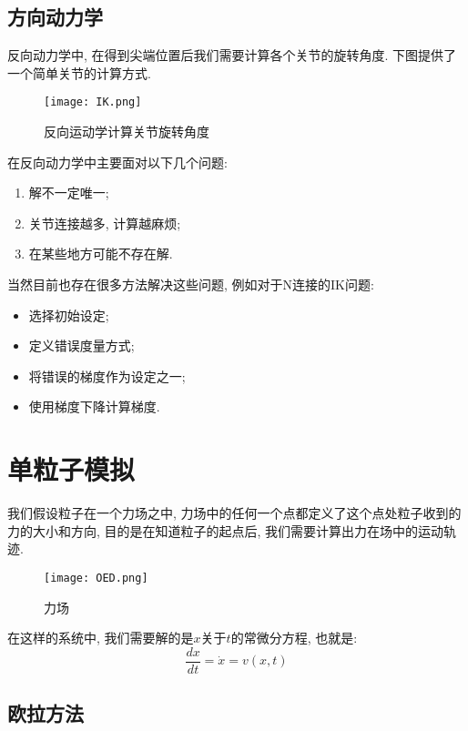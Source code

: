 \documentclass[openany]{progbookcn}
\begin{document}
\subsection{方向动力学}

反向动力学中, 在得到尖端位置后我们需要计算各个关节的旋转角度. 下图提供了一个简单关节的计算方式. 

\begin{figure}[H]
	\centering
	\texttt{[image: IK.png]}
	\caption{反向运动学计算关节旋转角度}
	\label{fig:ik}
\end{figure}

在反向动力学中主要面对以下几个问题: 
\begin{enumerate}
	\item 解不一定唯一; 
	\item 关节连接越多, 计算越麻烦; 
	\item 在某些地方可能不存在解. 
\end{enumerate}

当然目前也存在很多方法解决这些问题, 例如对于N连接的IK问题: 

\begin{itemize}
	\item 选择初始设定; 
	\item 定义错误度量方式; 
	\item 将错误的梯度作为设定之一; 
	\item 使用梯度下降计算梯度. 
\end{itemize}

\section{单粒子模拟}

我们假设粒子在一个力场之中, 力场中的任何一个点都定义了这个点处粒子收到的力的大小和方向, 目的是在知道粒子的起点后, 我们需要计算出力在场中的运动轨迹. 

\begin{figure}[H]
	\centering
	\texttt{[image: OED.png]}
	\caption{力场}
	\label{fig:OED}
\end{figure}

在这样的系统中, 我们需要解的是$x$关于$t$的常微分方程, 也就是: 
\begin{equation}
	\frac{d x}{d t}=\dot{x}=v(x, t)
\end{equation}

\subsection{欧拉方法}
\end{document}

